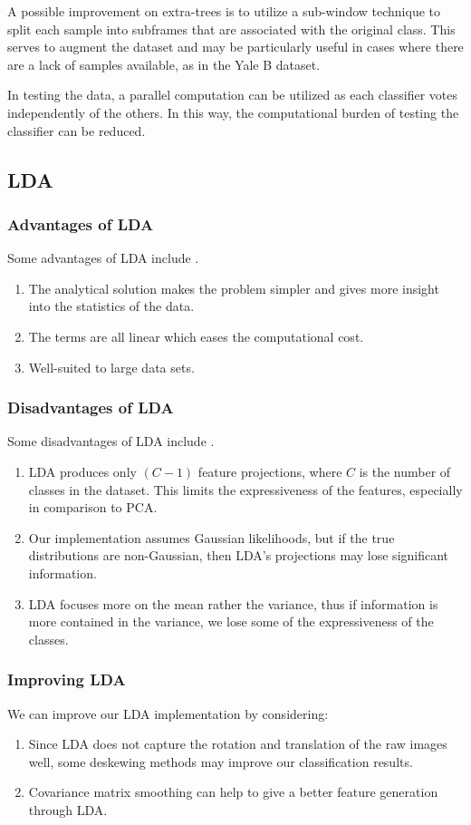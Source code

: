 A possible improvement on extra-trees is to utilize a sub-window technique to split each sample into subframes that are associated with the original class. This serves to augment the dataset and may be particularly useful in cases where there are a lack of samples available, as in the Yale B dataset.

In testing the data, a parallel computation can be utilized as each classifier votes independently of the others. In this way, the computational burden of testing the classifier can be reduced.

\subsection{LDA}
\subsubsection{Advantages of LDA}
Some advantages of LDA include \cite{book:advlda}.
%
\begin{enumerate}
	\item The analytical solution makes the problem simpler and gives more insight into the statistics of the data.
	\item The terms are all linear which eases the computational cost.
	\item Well-suited to large data sets.
\end{enumerate}

\subsubsection{Disadvantages of LDA}

Some disadvantages of LDA include \cite{notes:dislda}.
%
\begin{enumerate}
	\item LDA produces only $(C-1)$ feature projections, where $C$ is the number of classes in the dataset. This limits the expressiveness of the features, especially in comparison to PCA. 
	\item Our implementation assumes Gaussian likelihoods, but if the true distributions are non-Gaussian, then LDA's projections may lose significant information.
	\item LDA focuses more on the mean rather the variance, thus if information is more contained in the variance, we lose some of the expressiveness of the classes.
\end{enumerate}

\subsubsection{Improving LDA}

We can improve our LDA implementation by considering:
\begin{enumerate}
	\item Since LDA does not capture the rotation and translation of the raw images well, some deskewing methods may improve our classification results.
	\item Covariance matrix smoothing can help to give a better feature generation through LDA. 
\end{enumerate}